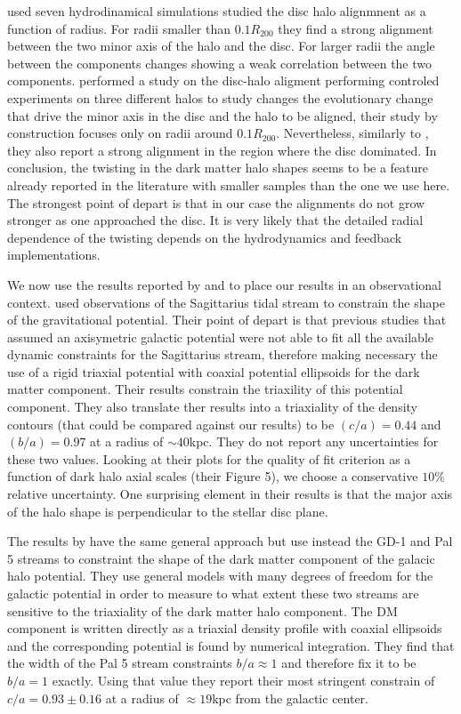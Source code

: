 \documentclass[usenatbib]{mnras}
\begin{document}
\cite{Bailin05} used seven hydrodinamical simulations studied the disc
halo alignmnent as a function of radius.
For radii smaller than $0.1R_{200}$ they find a strong alignment
between the two minor axis of the halo and the disc. 
For larger radii the angle between the components changes showing a
weak correlation between the two components. 
\cite{Debattista13} performed a study on the disc-halo aligment
performing controled experiments on three different halos to study
changes the evolutionary change that drive the minor axis in the disc
and the halo to be aligned, their study by construction focuses only
on radii around $0.1R_{200}$.
Nevertheless, similarly to \cite{Bailin05}, they also report a strong
alignment in the region where the disc dominated. 
In conclusion, the twisting in the dark matter halo shapes seems to be
a feature already reported in the literature with smaller samples than
the one we use here. 
The strongest point of depart is that in our case the alignments do
not grow stronger as one approached the disc.
It is very likely that the detailed radial dependence of the twisting
depends on the hydrodynamics and feedback implementations. 

We now use the results reported by \cite{LM10} and \cite{Bovy16}
to place our results in an observational context.
\cite{LM10} used observations of the Sagittarius tidal stream to
constrain the shape of the gravitational potential.
Their point of depart is that previous studies that assumed an
axisymetric galactic potential were not able to fit all the available
dynamic constraints for the Sagittarius stream, therefore making
necessary the use of a rigid triaxial potential with coaxial potential
ellipsoids for the dark matter component.  
Their results constrain the triaxility of this potential
component. 
They also translate ther results into a triaxiality of the density
contours (that could be compared against our results)
 to be $(c/a)=0.44$ and $(b/a)=0.97$ at a radius of $\sim 40$kpc. 
They do not report any uncertainties for these two values. 
Looking at their plots for the quality of fit criterion as a function
of dark halo axial scales (their Figure 5), we choose a conservative $10\%$
relative uncertainty.
One surprising element in their results is that  the major axis of the
halo shape is perpendicular to the stellar disc plane.  

The results by \cite{Bovy16} have the same general approach but use
instead the GD-1 \citep{2006ApJ...641L..37G} and Pal 5 \citep{2009AJ....137.3378O}
streams to constraint the shape of the dark matter component of the
galacic halo potential.
They use general models with many degrees of freedom for the galactic
potential in order to measure to what extent these two streams are sensitive
to the triaxiality of the dark matter halo component.
The DM component is written directly as a triaxial density profile
with coaxial ellipsoids and the corresponding potential is found by
numerical integration.
They find that the width of the Pal 5 stream constraints $b/a\approx
1$ and therefore fix it to be $b/a=1$ exactly.
Using that value they report their most stringent constrain of
$c/a=0.93\pm0.16$ at a radius of $\approx 19$kpc from the galactic
center. 
\end{document}
